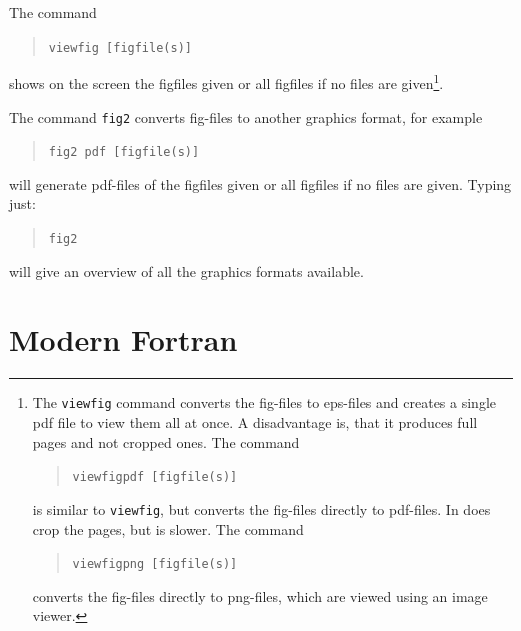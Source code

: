 The command 
\begin{quote}
   \texttt{viewfig [figfile(s)]}
\end{quote}
shows on the screen the figfiles given or all figfiles if no files are
given\footnote{The \texttt{viewfig} command converts the fig-files to eps-files
and creates a single pdf file to view them all at once. A disadvantage
is, that it produces full pages and not cropped ones.
The command 
\begin{quote}
   \texttt{viewfigpdf [figfile(s)]}
\end{quote}
is similar to \texttt{viewfig}, but converts the fig-files directly to pdf-files.
In does crop the pages, but is slower.
The command 
\begin{quote}
   \texttt{viewfigpng [figfile(s)]}
\end{quote}
converts the fig-files directly to png-files, which are viewed
using an image viewer.
}.

The command \texttt{fig2} converts fig-files to another graphics format, for example
\begin{quote}
   \texttt{fig2 pdf [figfile(s)]}
\end{quote}
will generate pdf-files of the figfiles given
or all figfiles if no files are given. Typing just:
\begin{quote}
   \texttt{fig2}
\end{quote}
will give an overview of all the graphics formats available.

\section{Modern Fortran}

